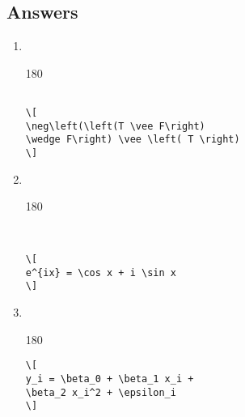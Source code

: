 
\subsection*{Answers}

\begin{enumerate}


\item ~\\

  \begin{turn}{180}
    \begin{minipage}{\linewidth}
      \begin{framed}
\begin{verbatim}

\[
\neg\left(\left(T \vee F\right)
\wedge F\right) \vee \left( T \right)
\]
\end{verbatim}
      \end{framed}
    \end{minipage}

  \end{turn}


\item ~\\

  \begin{turn}{180}
    \begin{minipage}{\linewidth}
      \begin{framed}
\begin{verbatim}


\[
e^{ix} = \cos x + i \sin x
\]

\end{verbatim}
      \end{framed}
    \end{minipage}

  \end{turn}


\item ~\\
  \begin{turn}{180}
    \begin{minipage}{\linewidth}
      \begin{framed}
\begin{verbatim}
\[
y_i = \beta_0 + \beta_1 x_i +
\beta_2 x_i^2 + \epsilon_i
\]
\end{verbatim}
      \end{framed}
    \end{minipage}
  \end{turn}


\end{enumerate}
